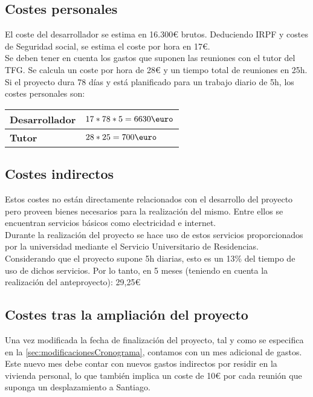 \subsection{Costes personales}

El coste del desarrollador se estima en 16.300{\euro} brutos. Deduciendo IRPF y costes de Seguridad social, se estima el coste por hora en 17{\euro}.\\

Se deben tener en cuenta los gastos que suponen las reuniones con el tutor del TFG. Se calcula un coste por hora de 28{\euro} y un tiempo total de reuniones en 25h.\\

Si el proyecto dura 78 días y está planificado para un trabajo diario de 5h, los costes personales son:\\

\begin{tabularx}{\linewidth}{|p{3cm}|X|}
    \hline
    \textbf{Desarrollador} & $17*78*5=6630\mbox{\euro}$ \tabularnewline
    \hline
    \textbf{Tutor} & $28*25=700\mbox{\euro}$ \tabularnewline
    \hline
\end{tabularx}

\subsection{Costes indirectos}

Estos costes no están directamente relacionados con el desarrollo del proyecto pero proveen bienes necesarios para la realización del mismo. Entre ellos se encuentran servicios básicos como electricidad e internet.\\

Durante la realización del proyecto se hace uso de estos servicios proporcionados por la universidad mediante el Servicio Universitario de Residencias. \\

Considerando que el proyecto supone 5h diarias, esto es un 13\% del tiempo de uso de dichos servicios. Por lo tanto, en 5 meses (teniendo en cuenta la realización del anteproyecto): 29,25{\euro}

\subsection{Costes tras la ampliación del proyecto}

Una vez modificada la fecha de finalización del proyecto, tal y como se especifica en la \autoref{sec:modificacionesCronograma}, contamos con un mes adicional de gastos. Este nuevo mes debe contar con nuevos gastos indirectos por residir en la vivienda personal, lo que también implica un coste de 10{\euro} por cada reunión que suponga un desplazamiento a Santiago.\\

